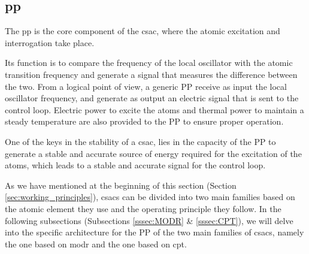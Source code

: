 \subsection{\acrfull{pp}}
\label{subsec:physics_package}

The \acrfull{pp} is the core component of the \acrshort{csac}, where the atomic excitation and interrogation take place.

Its function is to compare the frequency of the local oscillator with the atomic transition frequency and generate a signal that measures the difference between the two.
From a logical point of view, a generic PP receive as input the local oscillator frequency, and generate as output an electric signal that is sent to the control loop.
Electric power to excite the atoms and thermal power to maintain a steady temperature are also provided to the PP to ensure proper operation.

One of the keys in the stability of a \acrshort{csac}, lies in the capacity of the PP to generate a stable and accurate source of energy required for the excitation of the atoms, which leads to a stable and accurate signal for the control loop.

As we have mentioned at the beginning of this section (Section \ref{sec:working_principles}), \acrshort{csacs} can be divided into two main families based on the atomic element they use and the operating principle they follow.
In the following subsections (Subsections \ref{sssec:MODR} \& \ref{sssec:CPT}), we will delve into the specific architecture for the PP of the two main families of \acrshort{csacs}, namely the one based on \acrfull{modr} and the one based on \acrfull{cpt}.



